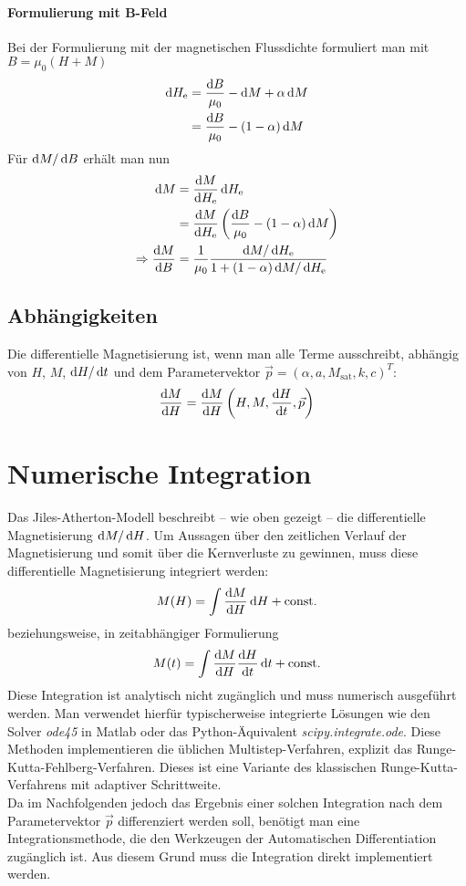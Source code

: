 \documentclass{scrartcl}
\newcommand{\He}{H_\text{e}}
\newcommand{\Msat}{M_\text{sat}}
\begin{document}
\paragraph{Formulierung mit B-Feld} Bei der Formulierung mit der magnetischen Flussdichte formuliert man mit $B = \mu_0(H + M)$
\begin{align}
	\dif \He &= \frac{\dif B}{\mu_0} - \dif M + \alpha \dif M \\
		&= \frac{\dif B}{\mu_0} - (1 - \alpha) \dif M
\end{align}
Für $\mathop{}\!\mathrm{d} M/\mathop{}\!\mathrm{d} B$ erhält man nun
\begin{align}
	\dif M &= \frac{\dif M}{\dif \He} \dif \He \\
	&=\frac{\dif M}{\dif \He}\left(\frac{\dif B}{\mu_0} - (1 - \alpha) \dif M\right) \\
	\Rightarrow \frac{\dif M}{\dif B} &= \frac{1}{\mu_0}\frac{\dif M/\dif \He}{1 + (1-\alpha) \dif M/\dif \He}
\end{align}
\subsection{Abhängigkeiten}
Die differentielle Magnetisierung ist, wenn man alle Terme ausschreibt, abhängig von $H$, $M$, $\mathop{}\!\mathrm{d} H/\mathop{}\!\mathrm{d} t$ und dem Parametervektor $\vec{p} = (\alpha, a, \Msat, k, c)^T$:
\begin{equation}
	\frac{\mathop{}\!\mathrm{d} M}{\mathop{}\!\mathrm{d} H} = \frac{\mathop{}\!\mathrm{d} M}{\mathop{}\!\mathrm{d} H}\left(H, M, \frac{\mathop{}\!\mathrm{d} H}{\mathop{}\!\mathrm{d} t}, \vec p \right)
\end{equation}
\section{Numerische Integration}
\label{sec:numeric-integration}
Das Jiles-Atherton-Modell beschreibt -- wie oben gezeigt -- die differentielle Magnetisierung $\mathop{}\!\mathrm{d} M /\mathop{}\!\mathrm{d} H$. Um Aussagen über den zeitlichen Verlauf der Magnetisierung und somit über die Kernverluste zu gewinnen, muss diese differentielle Magnetisierung integriert werden:
\begin{equation}
	M(H) = \int \frac{\mathop{}\!\mathrm{d} M}{\mathop{}\!\mathrm{d} H}\mathop{}\!\mathrm{d} H + \text{const.}
\end{equation}
beziehungsweise, in zeitabhängiger Formulierung
\begin{equation}
	M(t) = \int \frac{\mathop{}\!\mathrm{d} M}{\mathop{}\!\mathrm{d} H}\frac{\mathop{}\!\mathrm{d} H}{\mathop{}\!\mathrm{d} t}\mathop{}\!\mathrm{d} t + \text{const.}
\end{equation}
Diese Integration ist analytisch nicht zugänglich und muss numerisch ausgeführt werden. Man verwendet hierfür typischerweise integrierte Lösungen wie den Solver \emph{ode45} in Matlab oder das Python-Äquivalent \emph{scipy.integrate.ode}. Diese Methoden implementieren die üblichen Multistep-Verfahren, explizit das Runge-Kutta-Fehlberg-Verfahren. Dieses ist eine Variante des klassischen Runge-Kutta-Verfahrens mit adaptiver Schrittweite.\\
Da im Nachfolgenden jedoch das Ergebnis einer solchen Integration nach dem Parametervektor $\vec p$ differenziert werden soll, benötigt man eine Integrationsmethode, die den Werkzeugen der Automatischen Differentiation zugänglich ist. Aus diesem Grund muss die Integration direkt implementiert werden.
\end{document}
